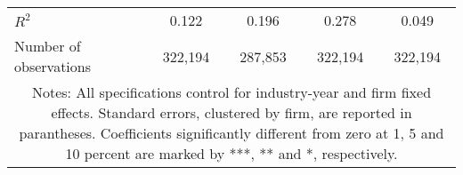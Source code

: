 \begin{tabular}{lcccc}
\\
	$R^2$ 
				& 0.122 
				& 0.196 
				& 0.278 
				& 0.049 \\
	Number of observations 
				& 322,194 
				& 287,853 
				& 322,194 
				& 322,194 \\
\hline \hline
\multicolumn{ 5 }{c}{\begin{minipage}{\textwidth}
\small Notes: All specifications control for industry-year and firm fixed effects. Standard errors, clustered by firm, are reported in parantheses. Coefficients significantly different from zero at 1, 5 and 10 percent are marked by ***, ** and *, respectively.

  \end{minipage} } \\
\end{tabular}